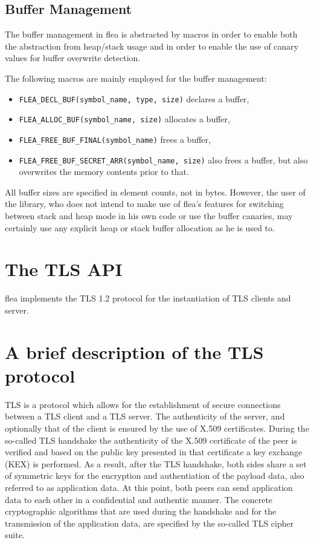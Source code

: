 \documentclass[a4paper,11pt]{scrartcl}
\begin{document}
\subsection{Buffer Management}
The buffer management in flea is abstracted by macros in order to enable both
the abstraction from heap/stack usage and in order to enable the use of canary
values for buffer overwrite detection.

The following  macros are mainly employed for the buffer management:
\begin{itemize}
  \item \verb#FLEA_DECL_BUF(symbol_name, type, size)# declares a buffer, 
  \item \verb#FLEA_ALLOC_BUF(symbol_name, size)# allocates a buffer, 
  \item \verb#FLEA_FREE_BUF_FINAL(symbol_name)# frees a buffer,
  \item \verb#FLEA_FREE_BUF_SECRET_ARR(symbol_name, size)# also frees a buffer,
    but also overwrites the memory contents prior to that.
\end{itemize}
All buffer sizes are specified in element counts, not in bytes. However, the
user of the library, who does not intend to make use of flea's features for 
switching between stack and heap mode in his own code or use the buffer
canaries, may certainly use any explicit heap or stack buffer allocation as he
is used to.




\section{The TLS API}

flea implements the TLS 1.2 protocol for the instantiation of TLS clients and
server. 

\section{A brief description of the TLS protocol}
TLS is a protocol which allows for the establishment of secure connections
between a TLS client and a TLS server. The authenticity of the server, and
optionally that of the client is ensured by the use of X.509 certificates.
During the so-called TLS handshake the authenticity of the X.509 certificate of
the peer is verified and based on the public key presented in that certificate
a key exchange (KEX) is performed. As a result, after the TLS handshake, both
sides share a set of symmetric keys for the encryption and authentiation of the
payload data, also referred to as application data. 
At this point, both peers
can send application data to each other in a confidential and authentic manner.
The concrete cryptographic algorithms that are used during the handshake and for the
transmission of the application data, are specified by the so-called TLS
cipher suite.
\end{document}
